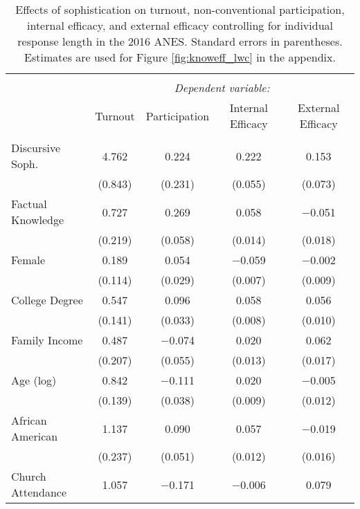 
\begin{table}[!htbp] \centering 
  \caption[Effects of sophistication on turnout, non-conventional participation, internal efficacy, 
  and external efficacy controlling for individual response length in the 2016 ANES]{Effects of sophistication on turnout, non-conventional participation, internal efficacy, 
          and external efficacy controlling for individual response length in the 2016 ANES. 
          Standard errors in parentheses. Estimates are used for Figure \ref{fig:knoweff_lwc} 
          in the appendix.} 
  \label{tab:knoweff2016_lwc} 
\begin{tabular}{@{\extracolsep{0pt}}lcccc} 
\\[-1.8ex]\hline 
\hline \\[-1.8ex] 
 & \multicolumn{4}{c}{\textit{Dependent variable:}} \\ 
\cline{2-5} 
 & Turnout & Participation & Internal Efficacy & External Efficacy \\ 
\hline \\[-1.8ex] 
 Discursive Soph. & 4.762 & 0.224 & 0.222 & 0.153 \\ 
  & (0.843) & (0.231) & (0.055) & (0.073) \\ 
  Factual Knowledge & 0.727 & 0.269 & 0.058 & $-$0.051 \\ 
  & (0.219) & (0.058) & (0.014) & (0.018) \\ 
  Female & 0.189 & 0.054 & $-$0.059 & $-$0.002 \\ 
  & (0.114) & (0.029) & (0.007) & (0.009) \\ 
  College Degree & 0.547 & 0.096 & 0.058 & 0.056 \\ 
  & (0.141) & (0.033) & (0.008) & (0.010) \\ 
  Family Income & 0.487 & $-$0.074 & 0.020 & 0.062 \\ 
  & (0.207) & (0.055) & (0.013) & (0.017) \\ 
  Age (log) & 0.842 & $-$0.111 & 0.020 & $-$0.005 \\ 
  & (0.139) & (0.038) & (0.009) & (0.012) \\ 
  African American & 1.137 & 0.090 & 0.057 & $-$0.019 \\ 
  & (0.237) & (0.051) & (0.012) & (0.016) \\ 
  Church Attendance & 1.057 & $-$0.171 & $-$0.006 & 0.079 \\ 

\end{tabular}
\end{table}
